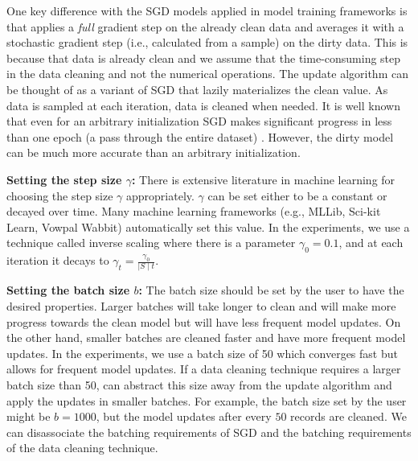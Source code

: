 One key difference with the SGD models applied in model training frameworks is that \sys applies a \emph{full} gradient step on the already clean data and averages it with a stochastic gradient step (i.e., calculated from a sample) on the dirty data. 
This is because that data is already clean and we assume that the time-consuming step in the data cleaning and not the numerical operations.
The update algorithm can be thought of as a variant of SGD that lazily materializes the clean value.
As data is sampled at each iteration, data is cleaned when needed.
It is well known that even for an arbitrary initialization SGD makes significant progress in less than one epoch (a pass through the entire dataset) \cite{bottou2012stochastic}.
However, the dirty model can be much more accurate than an arbitrary initialization.

\vspace{0.25em}

\noindent\textbf{ Setting the step size $\gamma$: } There is extensive literature in machine learning for choosing the step size $\gamma$ appropriately. $\gamma$ can be set either to be a constant or decayed over time. Many machine learning frameworks (e.g., MLLib, Sci-kit Learn, Vowpal Wabbit) automatically set this value. 
In the experiments, we use a technique called inverse scaling where there is a parameter $\gamma_0=0.1$, and at each iteration it decays to $\gamma_t = \frac{\gamma_0}{\mid S \mid t}$. 

\vspace{0.25em}

\noindent\textbf{ Setting the batch size $b$: } The batch size should be set by the user to have the desired properties.
Larger batches will take longer to clean and will make more progress towards the clean model but will have less frequent model updates.
On the other hand, smaller batches are cleaned faster and have more frequent model updates.
In the experiments, we use a batch size of 50 which converges fast but allows for frequent model updates.
If a data cleaning technique requires a larger batch size than 50, \sys can abstract this size away from the update algorithm and apply the updates in smaller batches.
For example, the batch size set by the user might be $b=1000$, but the model updates after every $50$ records are cleaned.
We can disassociate the batching requirements of SGD and the batching requirements of the data cleaning technique.

\vspace{0.25em}

